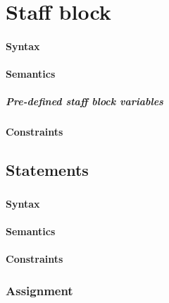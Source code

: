 \section{Staff block}
\paragraph{Syntax}

\paragraph{Semantics}

\subparagraph{Pre-defined staff block variables}

\paragraph{Constraints}

\subsection{Statements }
\subsubsection{ }
\paragraph{Syntax}


\paragraph{Semantics}
\paragraph{Constraints}

\subsubsection{ }

\subsubsection{Assignment}



